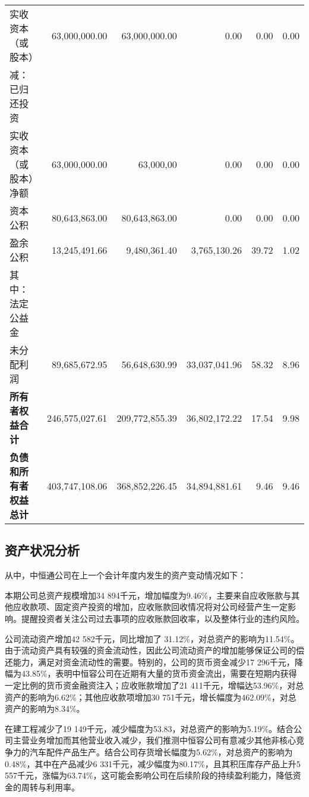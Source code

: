 \begin{longtable}{>{\scriptsize}p{8em}>{\scriptsize}r>{\scriptsize}r>{\scriptsize}r>{\scriptsize}r>{\scriptsize}r}
    \hspace{2ex}实收资本（或股本） & 63,000,000.00 & 63,000,000.00  & 0.00 & 0.00 & 0.00 \\
       \hspace{3ex} 减：已归还投资 &  &  &  &  & 	\\
    \hspace{2ex}实收资本（或股本）净额 & 63,000,000.00 & 63,000,00  & 0.00 & 0.00 & 0.00 \\
    \hspace{2ex}资本公积 & 80,643,863.00 & 80,643,863.00 & 0.00 & 0.00 & 0.00\\
    \hspace{2ex}盈余公积 & 13,245,491.66 & 9,480,361.40 & 3,765,130.26 & 39.72 & 1.02\\
        \hspace{2ex}其中：法定公益金 &  &  &  &  & \\
    \hspace{2ex}未分配利润 & 89,685,672.95 & 56,648,630.99 & 33,037,041.96 & 58.32 & 8.96\\		
\bfseries 所有者权益合计 & 246,575,027.61 & 209,772,855.39 & 36,802,172.22 & 17.54 & 9.98\\
  \hspace{2ex}\bfseries \bfseries 负债和所有者权益总计 & 403,747,108.06 & 368,852,226.45 & 34,894,881.61 & 9.46 & 9.46\\
\bottomrule
\end{longtable}\label{asset-debt}

\subsection{资产状况分析}{}
从中，中恒通公司在上一个会计年度内发生的资产变动情况如下：
\begin{compactenum}[(1) ]
 \item 本期公司总资产规模增加34 894千元，增加幅度为9.46\%，主要来自应收账款与其他应收款项、固定资产投资的增加，应收账款回收情况将对公司经营产生一定影响。提醒投资者关注公司过去事项的应收账款回收率，以及整体行业的违约风险。
 \item 公司流动资产增加42 582千元，同比增加了 31.12\%，对总资产的影响为11.54\%。由于流动资产具有较强的资金流动性，因此公司流动资产的增加能够保证公司的偿还能力，满足对资金流动性的需要。特别的，公司的货币资金减少17 296千元，降幅为43.85\%，表明中恒容公司在近期有大量的货币资金流出，需要在短期内获得一定比例的货币资金融资注入；应收账款增加了21 411千元，增幅达53.96\%，对总资产的影响为6.62\%；其他应收款项增加30 751千元，增长幅度为462.09\%，对总资产的影响为8.34\%。
 \item 在建工程减少了19 149千元，减少幅度为53.83，对总资产的影响为5.19\%。结合公司主营业务增加而其他营业收入减少，我们推测中恒容公司有意减少其他非核心竞争力的汽车配件产品生产。结合公司存货增长幅度为5.62\%，对总资产的影响为0.48\%，其中在产品减少6 331千元，减少幅度为80.17\%，且其积压库存产品上升5 557千元，涨幅为63.74\%，这可能会影响公司在后续阶段的持续盈利能力，降低资金的周转与利用率。
\end{compactenum}

